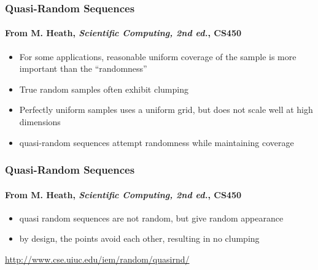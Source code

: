\documentclass[10pt]{beamer}
\begin{document}
\begin{frame}
\frametitle{Quasi-Random Sequences}
\framesubtitle{From M. Heath, \emph{Scientific Computing, 2nd ed.}, CS450}
\begin{itemize}
    \item For some applications, reasonable uniform coverage of the sample is
more important than the ``randomness''
    \item True random samples often exhibit clumping
    \item Perfectly uniform samples uses a uniform grid, but does not scale well
at high dimensions
    \item quasi-random sequences attempt randomness while maintaining coverage
\end{itemize}
\end{frame}
\begin{frame}
\frametitle{Quasi-Random Sequences}
\framesubtitle{From M. Heath, \emph{Scientific Computing, 2nd ed.}, CS450}
\begin{itemize}
    \item quasi random sequences are not random, but give random appearance
    \item by design, the points avoid each other, resulting in no clumping
\end{itemize}
\bigskip

\url{http://www.cse.uiuc.edu/iem/random/quasirnd/}
\end{frame}
\end{document}
